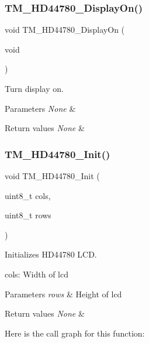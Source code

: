 \subsubsection{\texorpdfstring{T\+M\+\_\+\+H\+D44780\+\_\+\+Display\+On()}{TM\_HD44780\_DisplayOn()}}
{\footnotesize\ttfamily void T\+M\+\_\+\+H\+D44780\+\_\+\+Display\+On (\begin{DoxyParamCaption}\item[{void}]{ }\end{DoxyParamCaption})}



Turn display on. 


\begin{DoxyParams}{Parameters}
{\em None} & \\
\hline
\end{DoxyParams}

\begin{DoxyRetVals}{Return values}
{\em None} & \\
\hline
\end{DoxyRetVals}
\mbox{\label{group___t_m___h_d44780___functions_ga95ddcfeff8a1e3979f453e3e87164a37}} 
\subsubsection{\texorpdfstring{T\+M\+\_\+\+H\+D44780\+\_\+\+Init()}{TM\_HD44780\_Init()}}
{\footnotesize\ttfamily void T\+M\+\_\+\+H\+D44780\+\_\+\+Init (\begin{DoxyParamCaption}\item[{uint8\+\_\+t}]{cols,  }\item[{uint8\+\_\+t}]{rows }\end{DoxyParamCaption})}



Initializes H\+D44780 L\+CD. 

cols\+: Width of lcd 
\begin{DoxyParams}{Parameters}
{\em rows} & Height of lcd \\
\hline
\end{DoxyParams}

\begin{DoxyRetVals}{Return values}
{\em None} & \\
\hline
\end{DoxyRetVals}
Here is the call graph for this function\+:
\mbox{\label{group___t_m___h_d44780___functions_ga7bebbde61659ffbd254d5153ddf44ea4}} 
